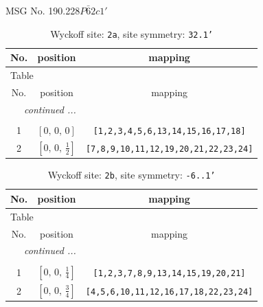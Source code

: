 \documentclass[fleqn,8pt]{jsarticle}
\begin{document}
\setcounter{MaxMatrixCols}{32}

\renewcommand{\tablename}{Table~}
\renewcommand{\figurename}{Figure~}
\begin{center}
\LARGE
MSG No. 190.228\quad$P\bar{6}2c1'$
\end{center}
\renewcommand{\arraystretch}{1.2}
\begin{longtable}{ccc}
\caption{Wyckoff site: {\tt 2a}, site symmetry: {\tt 32.1'}}
 \\
 \hline \hline
No. & position & mapping \\ \hline \endfirsthead

\multicolumn{2}{l}{\tablename\ \thetable{}} \\
 \hline \hline
No. & position & mapping \\ \hline \endhead

 \hline \hline
\multicolumn{2}{r}{\footnotesize\it continued ...} \\ \endfoot

 \hline \hline
\multicolumn{2}{r}{} \\ \endlastfoot

1 & $\left[ 0,\, 0,\, 0 \right]$ & {\tt [1,2,3,4,5,6,13,14,15,16,17,18]} \\ \hline
2 & $\left[ 0,\, 0,\, \frac{1}{2} \right]$ & {\tt [7,8,9,10,11,12,19,20,21,22,23,24]} \\
\end{longtable}
\renewcommand{\arraystretch}{1.2}
\begin{longtable}{ccc}
\caption{Wyckoff site: {\tt 2b}, site symmetry: {\tt -6..1'}}
 \\
 \hline \hline
No. & position & mapping \\ \hline \endfirsthead

\multicolumn{2}{l}{\tablename\ \thetable{}} \\
 \hline \hline
No. & position & mapping \\ \hline \endhead

 \hline \hline
\multicolumn{2}{r}{\footnotesize\it continued ...} \\ \endfoot

 \hline \hline
\multicolumn{2}{r}{} \\ \endlastfoot

1 & $\left[ 0,\, 0,\, \frac{1}{4} \right]$ & {\tt [1,2,3,7,8,9,13,14,15,19,20,21]} \\ \hline
2 & $\left[ 0,\, 0,\, \frac{3}{4} \right]$ & {\tt [4,5,6,10,11,12,16,17,18,22,23,24]} \\
\end{longtable}
\end{document}
